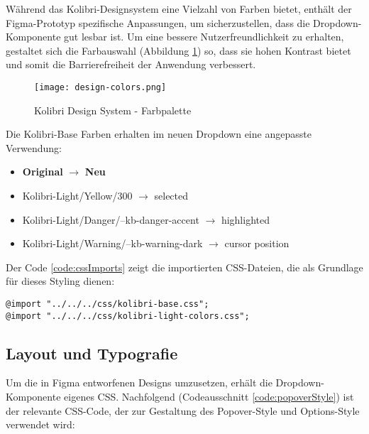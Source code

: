 Während das Kolibri-Designsystem eine Vielzahl von Farben bietet, enthält der Figma-Prototyp spezifische Anpassungen, um sicherzustellen, dass die Dropdown-Komponente gut lesbar ist.
Um eine bessere Nutzerfreundlichkeit zu erhalten, gestaltet sich die Farbauswahl (Abbildung \ref{img:designColors}) so, 
dass sie hohen Kontrast bietet und somit die Barrierefreiheit der Anwendung verbessert.

\begin{figure}[!htb]
    \centering
    \texttt{[image: design-colors.png]}
    \caption{Kolibri Design System - Farbpalette}
    \label{img:designColors}
\end{figure}

\noindent
Die Kolibri-Base Farben erhalten im neuen Dropdown eine angepasste Verwendung:

\begin{itemize}
    \item \textbf{Original} $\rightarrow$ \textbf{Neu}
    \item Kolibri-Light/Yellow/300 $\rightarrow$ selected
    \item Kolibri-Light/Danger/--kb-danger-accent $\rightarrow$ highlighted
    \item Kolibri-Light/Warning/--kb-warning-dark $\rightarrow$ cursor position
\end{itemize}

\noindent
Der Code \ref{code:cssImports} zeigt die importierten CSS-Dateien, die als Grundlage für dieses Styling dienen:

\begin{lstlisting}[style = htmlcssjs, caption = CSS Imports, label = code:cssImports]
@import "../../../css/kolibri-base.css";
@import "../../../css/kolibri-light-colors.css";
\end{lstlisting}


\subsection{Layout und Typografie}
\label{sec:layoutTypo}

Um die in Figma entworfenen Designs umzusetzen, erhält die Dropdown-Komponente eigenes CSS.
Nachfolgend (Codeausschnitt \ref{code:popoverStyle}) ist der relevante CSS-Code, der zur Gestaltung des Popover-Style und Options-Style verwendet wird:

